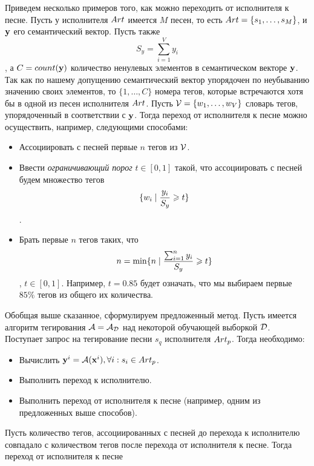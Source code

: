 Приведем несколько примеров того, как можно переходить от исполнителя к песне. Пусть у исполнителя ${Art}$ имеется $M$ песен, то есть ${Art} = \{ s_1, \ldots, s_M \}$, 
и $\mathbf{y}$ \ld его семантический вектор. Пусть также $$S_y = \sum_{i=1}^{V} y_i$$, а $C = count(\mathbf{y})$ \ld количество ненулевых элементов в семантическом векторе $\mathbf{y}$.
Так как по нашему допущению семантический вектор упорядочен по неубыванию значению своих элементов, то $\{ 1, \ldots, C \}$ \ld номера тегов, которые встречаются хотя бы в одной 
из песен исполнителя ${Art}$. Пусть $\mathcal{V} = \{w_1, \ldots, w_V \}$ \ld словарь тегов, упорядоченный в соответствии с $\mathbf{y}$. 
Тогда переход от исполнителя к песне можно осуществить, например, следующими способами:
\begin{itemize}
 \item Ассоциировать с песней первые $n$ тегов из $\mathcal{V}$.
 \item Ввести \emph{ограничивающий порог} $t \in [0, 1]$ такой, что ассоциировать с песней будем множество тегов 
 $$ \{ w_i \mid \frac{y_i}{S_y} \geqslant t \} $$.
 \item Брать первые $n$ тегов таких, что $$n = \min \{ n \mid \frac{\sum_{i=1}^{n} y_i}{S_y} \geqslant t \}$$, $t \in [0, 1]$. Например, $t = 0.85$ будет означать, 
 что мы выбираем первые $85\%$ тегов из общего их количества.
\end{itemize}


Обобщая выше сказанное, сформулируем предложенный метод. Пусть имеется алгоритм тегирования $\mathcal{A} = \mathcal{A}_{\mathcal{D}}$ над некоторой обучающей выборкой $\mathcal{D}$.
Поступает запрос на тегирование песни $s_q$ исполнителя ${Art}_p$. Тогда необходимо:
\begin{itemize}
 \item Вычислить $\mathbf{y}^i = \mathcal{A}(\mathbf{x}^i), \forall i: s_i \in {Art}_p$.
 \item Выполнить переход к исполнителю.
 \item Выполнить переход от исполнителя к песне (например, одним из предложенных выше способов).
\end{itemize}


\begin{prop}
Пусть количество тегов, ассоциированных с песней до перехода к исполнителю совпадало с количеством тегов после перехода от исполнителя к песне.
Тогда переход от исполнителя к песне 
\end{prop}









